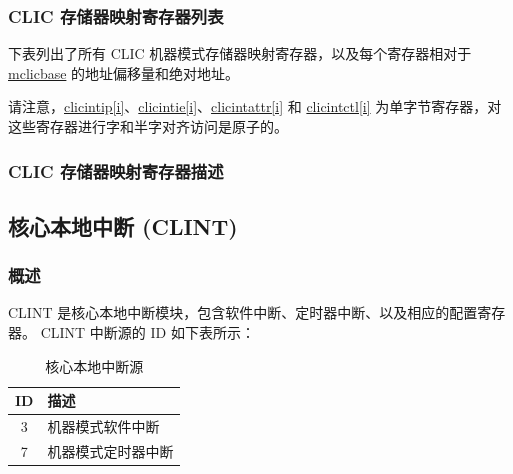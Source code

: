 \documentclass[main\_\_CN.tex]{subfiles}
\begin{document}

\hypertarget{riscvcpu-clic-memmap-reg-summ}{}
\subsubsection{CLIC 存储器映射寄存器列表}
\label{sec:riscvcpu-clic-memmap-reg-summ}

下表列出了所有 CLIC 机器模式存储器映射寄存器，以及每个寄存器相对于 \hyperref[fielddesc:MCLICBASE]{mclicbase} 的地址偏移量和绝对地址。

请注意，\hyperref[regdesc:MCLICINTIP_REG_i]{clicintip[i]}、\hyperref[regdesc:MCLICINTIE_REG_i]{clicintie[i]}、\hyperref[regdesc:MCLICINTATTR_REG_i]{clicintattr[i]} 和 \hyperref[regdesc:MCLICINTCTL_REG_i]{clicintctl[i]} 为单字节寄存器，对这些寄存器进行字和半字对齐访问是原子的。





\hypertarget{riscvcpu-clic-memmap-reg}{}
\subsubsection{CLIC 存储器映射寄存器描述}
\label{sec:riscvcpu-clic-memmap-reg}



\newpage
\subsection{核心本地中断 (CLINT)}
\label{sec:riscvcpu-clint}
\subsubsection{概述}
\label{sec:riscvcpu-clint-overview}
CLINT 是核心本地中断模块，包含软件中断、定时器中断、以及相应的配置寄存器。
CLINT 中断源的 ID 如下表所示：

\begin{longtable}{ | c | l | }
\caption{核心本地中断源} \label{tab:riscvcpu-clint-table}
\\ \hline
\rowcolor{lightgray}
ID & 描述 \\ \hline
3 & 机器模式软件中断 \\ \hline
7 & 机器模式定时器中断 \\ \hline
\end{longtable}
\end{document}
